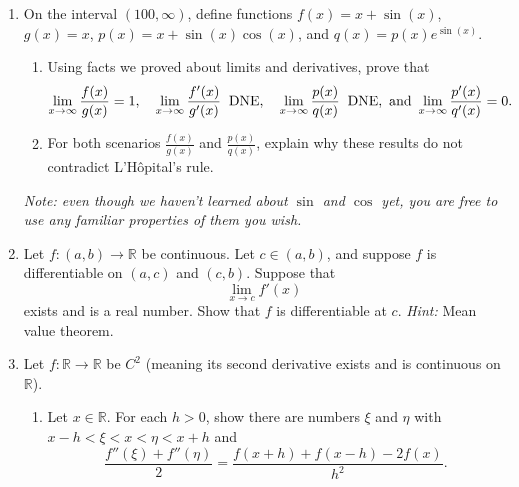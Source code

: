\documentclass[12pt, letterpaper]{article}
\newcommand{\0}{\mathbf{0}}
\newcommand{\1}{\mathbf{1}}
\begin{document}
\begin{enumerate}
\begin{enumerate}
        \item 
        Suppose $f : \mathbb{R} \to \mathbb{R}$ is H\"older continuous with exponent $\alpha > 1$. Show that $f$ is constant.
        
    \end{enumerate}

    \vspace{0.5cm}

    \item 
    On the interval $(100, \infty)$, define functions $f(x) = x + \sin(x)$, $g(x) = x$, $p(x) = x + \sin(x)\cos(x)$, and $q(x) = p(x)e^{\sin(x)}$.
    \begin{enumerate}
        \item 
        Using facts we proved about limits and derivatives, prove that
        \begin{equation*}
            \lim_{x \to \infty} \frac{f(x)}{g(x)} = 1, \quad \lim_{x \to \infty} \frac{f'(x)}{g'(x)} \;\; \text{DNE}, \quad \lim_{x \to \infty} \frac{p(x)}{q(x)} \;\; \text{DNE}, \text{ and } \lim_{x \to \infty} \frac{p'(x)}{q'(x)} = 0.\\
        \end{equation*}
        \item 
        For both scenarios $\frac{f(x)}{g(x)}$ and $\frac{p(x)}{q(x)}$, explain why these results do not contradict L'H\^opital's rule.
        
    \end{enumerate}

    \textit{Note: even though we haven't learned about $\sin$ and $\cos$ yet, you are free to use any familiar properties of them you wish.}

    \vspace{0.5cm}

    \item 
    Let $f : (a, b) \to \mathbb{R}$ be continuous. Let $c \in (a, b)$, and suppose $f$ is differentiable on $(a, c)$ and $(c, b)$. Suppose that 
    \begin{equation*}
        \lim_{x \to c} f'(x)
    \end{equation*}
    exists and is a real number. Show that $f$ is differentiable at $c$. \textit{Hint:} Mean value theorem.
    

    \vspace{0.5cm}

    \item 
    Let $f : \mathbb{R} \to \mathbb{R}$ be $C^2$ (meaning its second derivative exists and is continuous on $\mathbb{R}$).
    \begin{enumerate}
        \item 
        Let $x \in \mathbb{R}$. For each $h > 0$, show there are numbers $\xi$ and $\eta$ with $x - h < \xi < x < \eta < x + h$ and
        \begin{equation*}
            \frac{f''(\xi) + f''(\eta)}{2} = \frac{f(x + h) + f(x - h) - 2f(x)}{h^2}.
        \end{equation*}
        

\end{enumerate}
\end{enumerate}
\end{document}
